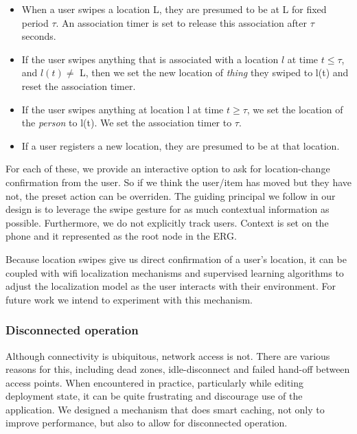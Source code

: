 \begin{itemize}
\item When a user swipes a location L, they are presumed to be at L for fixed period $\tau$.  An association timer is set to 
		release this association after $\tau$ seconds.
\item If the user swipes anything that is associated with a location $l$ at time $t \le \tau$, and $l(t)\ne$ L, 
		then we set the new location of \emph{thing} they swiped to l(t) and reset the association timer.
\item If the user swipes anything at location l at time $t \ge \tau$, we set the location of the \emph{person} to l(t).
		We set the association timer to $\tau$.
\item If a user registers a new location, they are presumed to be at that location.
\end{itemize}
\vspace{0.08in}


For each of these, we provide an interactive option to ask for location-change confirmation from the user.  So if we think the
user/item has moved but they have not, the preset action can be overriden.  The guiding principal we follow in our design
is to leverage the swipe gesture for as much contextual information as possible.  Furthermore, we do not explicitly track users.
Context is set on the phone and it represented as the root node in the ERG.

Because location swipes give us direct confirmation of a user's location, it can be coupled with wifi localization mechanisms
and supervised learning algorithms to adjust the localization model as the user interacts with their environment. 
For future work we intend to experiment with this mechanism.%


\subsubsection{Disconnected operation}
Although connectivity is ubiquitous, network access is not.  There are various reasons for this, including dead zones, 
idle-disconnect and failed hand-off between access points.  When encountered in practice, particularly while editing
deployment state, it can be quite frustrating and discourage use of the application.  We designed a
mechanism that does smart caching, not only to improve performance, but also to allow for disconnected operation.


